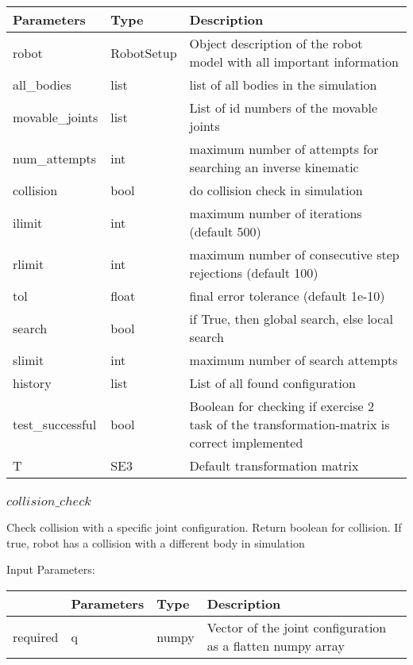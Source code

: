 \documentclass[
	ngerman,
	accentcolor=9c,%
	type=intern,
	marginpar=false
	]{tudapub}
\begin{document}
\vspace{0.5cm}
\begin{tabular}{|p{}| p{}| p{}|}
\hline
\textbf{Parameters} & \textbf{Type} & \textbf{Description} \\
\hline
robot & RobotSetup & Object description of the robot model with all important information \\
\hline
all\_bodies & list & list of all bodies in the simulation \\
\hline
movable\_joints & list & List of id numbers of the movable joints \\
\hline
num\_attempts & int & maximum number of attempts for searching an inverse kinematic \\
\hline
collision & bool & do collision check in simulation \\
\hline
ilimit & int & maximum number of iterations (default 500) \\
\hline
rlimit & int & maximum number of consecutive step rejections (default 100) \\
\hline
tol & float & final error tolerance (default 1e-10) \\
\hline
search & bool & if True, then global search, else local search \\
\hline
slimit & int & maximum number of search attempts \\
\hline
history & list & List of all found configuration  \\
\hline
test\_successful & bool & Boolean for checking if exercise 2 task of the transformation-matrix is correct implemented \\
\hline
T & SE3 & Default transformation matrix\\
\hline
\end{tabular}

\vspace{1cm}

\subsubsection{$collision\_check$}
\noindent Check collision with a specific joint configuration. Return boolean for collision. If true, robot has a collision with a different body in simulation

\vspace{0.5cm}
\noindent Input Parameters:
\vspace{0.5cm}

\begin{tabular}{|p{}|p{}|p{}| p{}|}
\hline
 & \textbf{Parameters} & \textbf{Type} & \textbf{Description} \\
\hline
required & q & numpy & Vector of the joint configuration as a flatten numpy array\\
\hline
\end{tabular}
\vspace{1cm}
\end{document}
